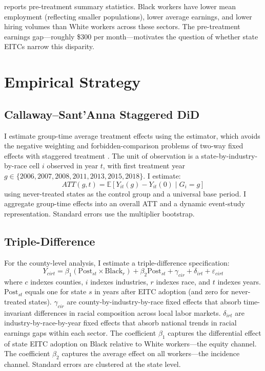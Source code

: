 \documentclass[12pt]{article}
\newcommand{\E}{\mathbb{E}}
\begin{document}


 reports pre-treatment summary statistics. Black workers have lower mean employment (reflecting smaller populations), lower average earnings, and lower hiring volumes than White workers across these sectors. The pre-treatment earnings gap---roughly \$300 per month---motivates the question of whether state EITCs narrow this disparity.

\section{Empirical Strategy}

\subsection{Callaway--Sant'Anna Staggered DiD}

I estimate group-time average treatment effects using the \citet{callaway2021} estimator, which avoids the negative weighting and forbidden-comparison problems of two-way fixed effects with staggered treatment \citep{goodman-bacon2021, sun2021}. The unit of observation is a state-by-industry-by-race cell $i$ observed in year $t$, with first treatment year $g \in \{2006, 2007, 2008, 2011, 2013, 2015, 2018\}$. I estimate:
\begin{equation}
  ATT(g,t) = \E[Y_{it}(g) - Y_{it}(0) \mid G_i = g]
\end{equation}
using never-treated states as the control group and a universal base period. I aggregate group-time effects into an overall ATT and a dynamic event-study representation. Standard errors use the multiplier bootstrap.

\subsection{Triple-Difference}

For the county-level analysis, I estimate a triple-difference specification:
\begin{equation}
  Y_{cirt} = \beta_1 (\text{Post}_{st} \times \text{Black}_r) + \beta_2 \text{Post}_{st} + \gamma_{cir} + \delta_{irt} + \varepsilon_{cirt}
  \label{eq:ddd}
\end{equation}
where $c$ indexes counties, $i$ indexes industries, $r$ indexes race, and $t$ indexes years. $\text{Post}_{st}$ equals one for state $s$ in years after EITC adoption (and zero for never-treated states). $\gamma_{cir}$ are county-by-industry-by-race fixed effects that absorb time-invariant differences in racial composition across local labor markets. $\delta_{irt}$ are industry-by-race-by-year fixed effects that absorb national trends in racial earnings gaps within each sector. The coefficient $\beta_1$ captures the differential effect of state EITC adoption on Black relative to White workers---the equity channel. The coefficient $\beta_2$ captures the average effect on all workers---the incidence channel. Standard errors are clustered at the state level.
\end{document}
